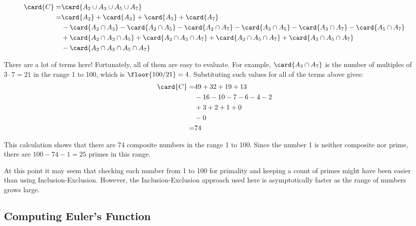 \begin{align*}
\card{C}
  = & \card{A_2 \cup A_3 \cup A_5 \cup A_7} \\
  = & \card{A_2} + \card{A_3} + \card{A_5} + \card{A_7} \\
    & - \card{A_2 \cap A_3} - \card{A_2 \cap A_5} - \card{A_2 \cap A_7}
             - \card{A_3 \cap A_5} - \card{A_3 \cap A_7} - \card{A_5 \cap A_7} \\
    & + \card{A_2 \cap A_3 \cap A_5} + \card{A_2 \cap A_3 \cap A_7}
             + \card{A_2 \cap A_5 \cap A_7} + \card{A_3 \cap A_5 \cap A_7} \\
    & - \card{A_2 \cap A_3 \cap A_5 \cap A_7}
\end{align*}

There are a lot of terms here!  Fortunately, all of them are easy to
evaluate.  For example, $\card{A_3 \cap A_7}$ is the number of multiples
of $3 \cdot 7 = 21$ in the range 1 to 100, which is $\floor{100/21} = 4$.
\iffalse (Note that there is no reason to subtract 1 as we did when
evaluating $\card{A_m}$ above.)\fi Substituting such values for all of the
terms above gives:
\begin{align*}
\card{C}  = & 49 + 32 + 19 + 13 \\
            & - 16 - 10 - 7 - 6 - 4 - 2 \\
            & + 3 + 2 + 1 + 0 \\
            & - 0 \\
          = & 74
\end{align*}

This calculation shows that there are 74 composite numbers in the
range 1 to 100.  Since the number 1 is neither composite nor prime,
there are $100 - 74 - 1 = 25$ primes in this range.

At this point it may seem that checking each number from 1 to 100 for
primality and keeping a count of primes might have been easier than using
Inclusion-Exclusion.  However, the Inclusion-Exclusion approach used here
is asymptotically faster as the range of numbers grows large.\iffalse The
naive strategy requires $n$ runs of a primality test if the upper bound is
$n$.  The Inclusion-Exclusion approach seems to require summing an immense
number of terms, but fewer than $n$ of these are non-zero and the rest can
be ignored.\fi
\fi


\subsection{Computing Euler's Function}

